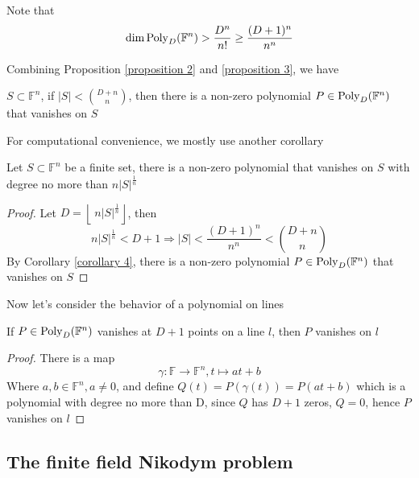 \begin{remark}
Note that
$$ \mathrm{dim}\operatorname{Poly}_{D}(\mathbb{F}^{n}) > \dfrac{D^{n}}{n!} \geq \dfrac{(D+1)^{n}}{n^{n}} $$

\end{remark}

Combining Proposition \ref{proposition 2} and \ref{proposition 3}, we have

\begin{corollary}\label{corollary 4}
$ S \subset \mathbb{F}^{n} $, if $ |S| < \binom{D+n}{n} $, then there is a non-zero polynomial $ P \in \operatorname{Poly}_{D}(\mathbb{F}^{n}) $ that vanishes on $ S $
\end{corollary}

For computational convenience, we mostly use another corollary

\begin{corollary}\label{corollary 5}
Let $ S \subset \mathbb{F}^{n} $ be a finite set, there is a non-zero polynomial that vanishes on $ S $ with degree no more than $ n|S|^{\frac{1}{n}} $
\end{corollary}

\begin{proof}
Let $ D = \left\lfloor\ n|S|^{\frac{1}{n}} \right\rfloor $, then 
$$ n|S|^{\frac{1}{n}} < D+1 \Rightarrow |S| < \dfrac{(D+1)^{n}}{n^{n}} < \binom{D+n}{n} $$
By Corollary \ref{corollary 4}, there is a non-zero polynomial $ P \in \operatorname{Poly}_{D}(\mathbb{F}^{n}) $ that vanishes on $ S $
\end{proof}

Now let's consider the behavior of a polynomial on lines

\begin{proposition}\label{proposition 6}
If $ P \in \operatorname{Poly}_{D}(\mathbb{F}^{n}) $ vanishes at $ D+1 $ points on a line $ l $, then $ P $ vanishes on $ l $
\end{proposition}

\begin{proof}
There is a map 
$$ \gamma : \mathbb{F} \rightarrow \mathbb{F}^{n}, t \mapsto at+b $$
Where $ a,b \in \mathbb{F}^{n}, a \neq 0 $, and define $ Q(t) = P(\gamma(t)) = P(at+b) $ which is a polynomial with degree no more than D, since $ Q $ has $ D+1 $ zeros, $ Q = 0 $, hence $ P $ vanishes on $ l $
\end{proof}

\subsection{The finite field Nikodym problem}

